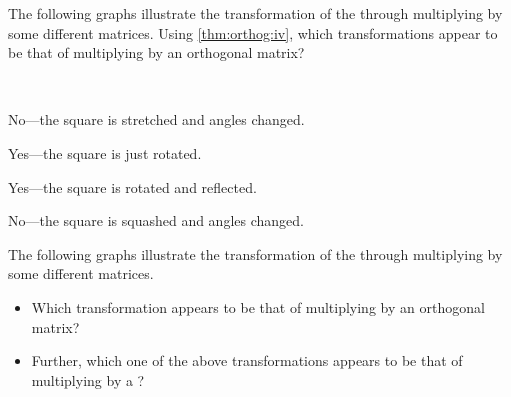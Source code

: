 \begin{example} 
The following graphs illustrate the transformation of the  through multiplying by some different matrices. 
Using \cref{thm:orthog:iv}, which transformations appear to be that of multiplying by an orthogonal matrix?
\begin{Parts}
\item {}
\item {}
\item {}
\item {}
\end{Parts}

\begin{solution} \ 
\begin{Parts}
\item No---the square is stretched and angles changed.
\item Yes---the square is just rotated.
\item Yes---the square is rotated and reflected.
\item No---the square is squashed and angles changed.
\end{Parts}
\end{solution}
\end{example}



\begin{activity}
The following graphs illustrate the transformation of the  through multiplying by some different matrices. 
\begin{itemize}
\item Which transformation appears to be that of multiplying by an orthogonal matrix?
\actposs{\TwoD{-0.85}{-0.52}{-0.52}{0.85}}
{}
{}
{}
\item Further, which one of the above transformations appears to be that of multiplying by a ?
\end{itemize}
\end{activity}





